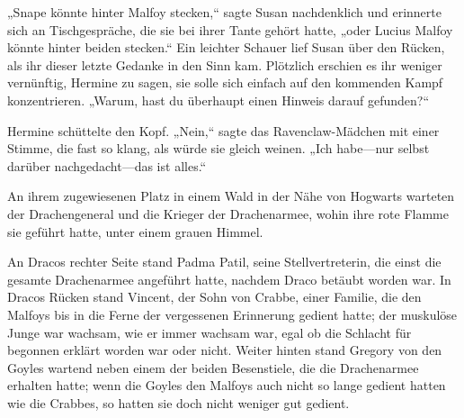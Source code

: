 „Snape könnte hinter Malfoy stecken,“ sagte Susan nachdenklich und erinnerte sich an Tischgespräche, die sie bei ihrer Tante gehört hatte, „oder Lucius Malfoy könnte hinter beiden stecken.“ Ein leichter Schauer lief Susan über den Rücken, als ihr dieser letzte Gedanke in den Sinn kam. Plötzlich erschien es ihr weniger vernünftig, Hermine zu sagen, sie solle sich einfach auf den kommenden Kampf konzentrieren. „Warum, hast du überhaupt einen Hinweis darauf gefunden?“

Hermine schüttelte den Kopf. „Nein,“ sagte das Ravenclaw-Mädchen mit einer Stimme, die fast so klang, als würde sie gleich weinen. „Ich habe—nur selbst darüber nachgedacht—das ist alles.“

\later

An ihrem zugewiesenen Platz in einem Wald in der Nähe von Hogwarts warteten der Drachengeneral und die Krieger der Drachenarmee, wohin ihre rote Flamme sie geführt hatte, unter einem grauen Himmel.

An Dracos rechter Seite stand Padma Patil, seine Stellvertreterin, die einst die gesamte Drachenarmee angeführt hatte, nachdem Draco betäubt worden war. In Dracos Rücken stand Vincent, der Sohn von Crabbe, einer Familie, die den Malfoys bis in die Ferne der vergessenen Erinnerung gedient hatte; der muskulöse Junge war wachsam, wie er immer wachsam war, egal ob die Schlacht für begonnen erklärt worden war oder nicht. Weiter hinten stand Gregory von den Goyles wartend neben einem der beiden Besenstiele, die die Drachenarmee erhalten hatte; wenn die Goyles den Malfoys auch nicht so lange gedient hatten wie die Crabbes, so hatten sie doch nicht weniger gut gedient.

